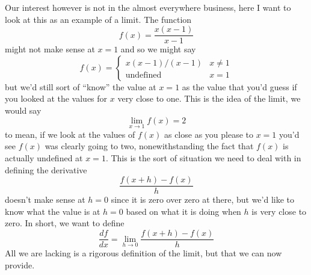 \documentclass[12pt]{article}
\begin{document}
Our interest however is not in the almost everywhere business, here I want to look at this as an example of a limit. The function
\begin{equation}
  f(x)=\frac{x(x-1)}{x-1}
\end{equation}
might not make sense at $x=1$ and so we might say
\begin{equation}
  f(x)=\left\{\begin{array}{ll}x(x-1)/(x-1)&x\not= 1\\\mbox{undefined}&x=1\end{array}\right.
  \end{equation}
but we'd still sort of ``know'' the value at $x=1$ as the value that
you'd guess if you looked at the values for $x$ very close to one. This is the idea of the limit, we would say
\begin{equation}
  \lim_{x\rightarrow 1}f(x)=2
\end{equation}
to mean, if we look at the values of $f(x)$ as close as you please to
$x=1$ you'd see $f(x)$ was clearly going to two, nonewithstanding the
fact that $f(x)$ is actually undefined at $x=1$. This is the sort of
situation we need to deal with in defining the derivative
\begin{equation}
  \frac{f(x+h)-f(x)}{h}
\end{equation}
doesn't make sense at $h=0$ since it is zero over zero at there, but
we'd like to know what the value is at $h=0$ based on what it is doing
when $h$ is very close to zero. In short, we want to define
\begin{equation}
  \frac{df}{dx}=\lim_{h\rightarrow 0}\frac{f(x+h)-f(x)}{h}
\end{equation}
All we are lacking is a rigorous definition of the limit, but that we
can now provide.
\end{document}
